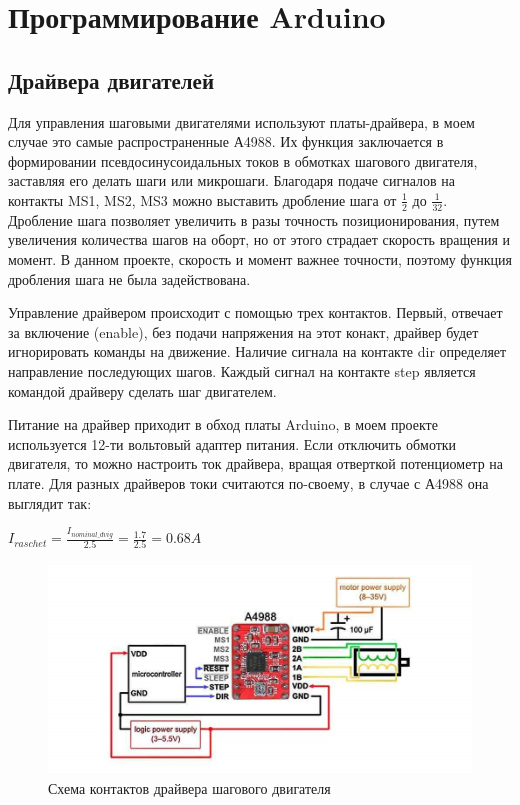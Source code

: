\section{Программирование Arduino}
\subsection{Драйвера двигателей}

Для управления шаговыми двигателями используют платы-драйвера, в моем случае это самые распространенные А4988. Их функция заключается в формировании псевдосинусоидальных токов в обмотках шагового двигателя, заставляя его делать шаги или микрошаги. Благодаря подаче сигналов на контакты MS1, MS2, MS3 можно выставить дробление шага от $\frac{1}{2}$ до $\frac{1}{32}$. Дробление шага позволяет увеличить в разы точность позиционирования, путем увеличения количества шагов на оборт, но от этого страдает скорость вращения и момент. В данном проекте, скорость и момент важнее точности, поэтому функция дробления шага не была задействована.

Управление драйвером происходит с помощью трех контактов. Первый, отвечает за включение (enable), без подачи напряжения на этот конакт, драйвер будет игнорировать команды на движение. Наличие сигнала на контакте dir определяет направление последующих шагов. Каждый сигнал на контакте step является командой драйверу сделать шаг двигателем.    

Питание на драйвер приходит в обход платы Arduino, в моем проекте используется 12-ти вольтовый адаптер питания. Если отключить обмотки двигателя, то можно настроить ток драйвера, вращая отверткой потенциометр на плате. Для разных драйверов токи считаются по-своему, в случае с А4988 она выглядит так:

\begin{center}
$I_{raschet} = \frac{I_{nominal\_dvig}}{2.5} = \frac{1.7}{2.5} = 0.68 A $
\end{center}

\begin{figure}[h]
\centering
\includegraphics[width=0.8\linewidth]{./image/a4988}
\caption{Схема контактов драйвера шагового двигателя}
\end{figure}


